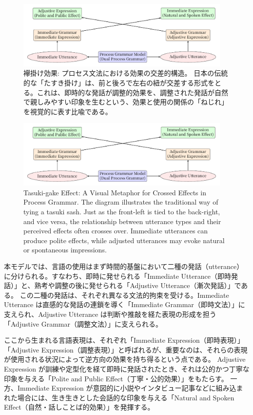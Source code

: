 \documentclass[a4paper,xelatex,ja=standard]{bxjsarticle}
\begin{document}
\ifJPN
  \begin{figure}[htb]\centering\small
    \includegraphics[width=0.95\textwidth]{tasuki-gake.pdf}
    \caption{襷掛け効果: プロセス文法における効果の交差的構造。
    日本の伝統的な「たすき掛け」は、前と後ろで左右の紐が交差する形式をとる。これは、即時的な発話が調整的効果を、調整された発話が自然で親しみやすい印象を生むという、効果と使用の関係の「ねじれ」を視覚的に表す比喩である。
    }\label{fig:tasuki-gake-j}
  \end{figure}
\else
  \begin{figure}[htb]\centering\small
    \includegraphics[width=0.95\textwidth]{tasuki-gake.pdf}
    \caption{Tasuki-gake Effect: A Visual Metaphor for Crossed Effects in Process Grammar. The diagram illustrates the traditional way of tying a tasuki sash. Just as the front-left is tied to the back-right, and vice versa, the relationship between utterance types and their perceived effects often crosses over. Immediate utterances can produce polite effects, while adjusted utterances may evoke natural or spontaneous impressions.
    }\label{fig:tasuki-gake}
  \end{figure}
\fi

\ifJPN
本モデルでは、言語の使用はまず時間的基盤において二種の発話（utterance）に分けられる。すなわち、即時に発せられる「Immediate Utterance（即時発話）」と、熟考や調整の後に発せられる「Adjustive Utterance（漸次発話）」である。
この二種の発話は、それぞれ異なる文法的拘束を受ける。Immediate Utterance は直感的な発話の連鎖を導く「Immediate Grammar（即時文法）」に支えられ、Adjustive Utterance は判断や推敲を経た表現の形成を担う「Adjustive Grammar（調整文法）」に支えられる。

ここから生まれる言語表現は、それぞれ「Immediate Expression（即時表現）」「Adjustive Expression（調整表現）」と呼ばれるが、重要なのは、それらの表現が使用される状況によって逆方向の効果を持ち得るという点である。
Adjustive Expression が訓練や定型化を経て即時に発話されたとき、それは公的かつ丁寧な印象を与える「Polite and Public Effect（丁寧・公的効果）」をもたらす。
一方、Immediate Expression が意図的に小説やインタビュー記事などに組み込まれた場合には、生き生きとした会話的な印象を与える「Natural and Spoken Effect（自然・話しことば的効果）」を発揮する。
\end{document}
